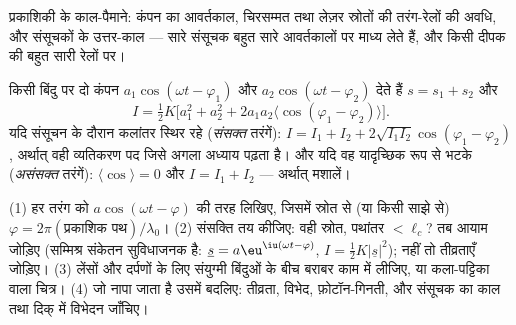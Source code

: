 \begin{omfigure}

{\small प्रकाशिकी के काल-पैमाने: कंपन का आवर्तकाल, चिरसम्मत तथा लेज़र
स्रोतों की तरंग-रेलों की अवधि, और संसूचकों के
उत्तर-काल --- सारे संसूचक बहुत सारे आवर्तकालों पर माध्य लेते हैं, और किसी
दीपक की बहुत सारी रेलों पर।}
\end{omfigure}

\begin{remark}[संसक्त और असंसक्त अध्यारोपण]\label{rem:b2:scalar-light-model:superposition}
किसी बिंदु पर दो कंपन $a_1\cos(\omega t - \varphi_1)$ और $a_2\cos(\omega t - \varphi_2)$
देते हैं $s = s_1 + s_2$ और
\[
I = \tfrac12K\bigl[a_1^2 + a_2^2 + 2a_1a_2\langle\cos(\varphi_1 - \varphi_2)\rangle\bigr] .
\]
यदि संसूचन के दौरान कलांतर स्थिर रहे
(\emph{संसक्त} तरंगें): $I = I_1 + I_2 + 2\sqrt{I_1I_2}\cos(\varphi_1 - \varphi_2)$,
अर्थात् वही व्यतिकरण पद जिसे अगला अध्याय पढ़ता है। और यदि वह
यादृच्छिक रूप से भटके (\emph{असंसक्त} तरंगें): $\langle\cos\rangle = 0$ और $I = I_1 +
I_2$ --- अर्थात् मशालें।
\end{remark}

\begin{method}[कोई प्रकाशिकी समस्या सजाना]\label{met:b2:scalar-light-model:method}
(1) हर तरंग को $a\cos(\omega t - \varphi)$ की तरह लिखिए, जिसमें स्रोत से (या किसी साझे
 से) $\varphi = 2\pi(\text{प्रकाशिक
पथ})/\lambda_0$। (2) संसक्ति तय कीजिए:
वही स्रोत, पथांतर $< \ell_c$? तब आयाम जोड़िए
(सम्मिश्र संकेतन सुविधाजनक है: $\underline s = a\eu^{\iu(\omega t - \varphi)}$, $I =
\tfrac12K|\underline s|^2$); नहीं तो तीव्रताएँ जोड़िए। (3) लेंसों और
दर्पणों के लिए संयुग्मी बिंदुओं के बीच बराबर  काम में लीजिए, या
कला-पट्टिका वाला चित्र। (4) जो नापा जाता है उसमें बदलिए: तीव्रता,
विभेद, फ़ोटॉन-गिनती, और संसूचक का काल तथा दिक् में विभेदन जाँचिए।
\end{method}

